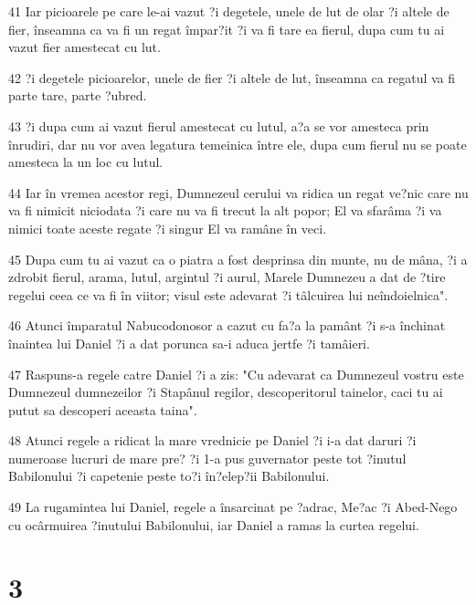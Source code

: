 \par 41 Iar picioarele pe care le-ai vazut ?i degetele, unele de lut de olar ?i altele de fier, înseamna ca va fi un regat împar?it ?i va fi tare ea fierul, dupa cum tu ai vazut fier amestecat cu lut.
\par 42 ?i degetele picioarelor, unele de fier ?i altele de lut, înseamna ca regatul va fi parte tare, parte ?ubred.
\par 43 ?i dupa cum ai vazut fierul amestecat cu lutul, a?a se vor amesteca prin înrudiri, dar nu vor avea legatura temeinica între ele, dupa cum fierul nu se poate amesteca la un loc cu lutul.
\par 44 Iar în vremea acestor regi, Dumnezeul cerului va ridica un regat ve?nic care nu va fi nimicit niciodata ?i care nu va fi trecut la alt popor; El va sfarâma ?i va nimici toate aceste regate ?i singur El va ramâne în veci.
\par 45 Dupa cum tu ai vazut ca o piatra a fost desprinsa din munte, nu de mâna, ?i a zdrobit fierul, arama, lutul, argintul ?i aurul, Marele Dumnezeu a dat de ?tire regelui ceea ce va fi în viitor; visul este adevarat ?i tâlcuirea lui neîndoielnica".
\par 46 Atunci împaratul Nabucodonosor a cazut cu fa?a la pamânt ?i s-a închinat înaintea lui Daniel ?i a dat porunca sa-i aduca jertfe ?i tamâieri.
\par 47 Raspuns-a regele catre Daniel ?i a zis: "Cu adevarat ca Dumnezeul vostru este Dumnezeul dumnezeilor ?i Stapânul regilor, descoperitorul tainelor, caci tu ai putut sa descoperi aceasta taina".
\par 48 Atunci regele a ridicat la mare vrednicie pe Daniel ?i i-a dat daruri ?i numeroase lucruri de mare pre? ?i 1-a pus guvernator peste tot ?inutul Babilonului ?i capetenie peste to?i în?elep?ii Babilonului.
\par 49 La rugamintea lui Daniel, regele a însarcinat pe ?adrac, Me?ac ?i Abed-Nego cu ocârmuirea ?inutului Babilonului, iar Daniel a ramas la curtea regelui.

\chapter{3}

